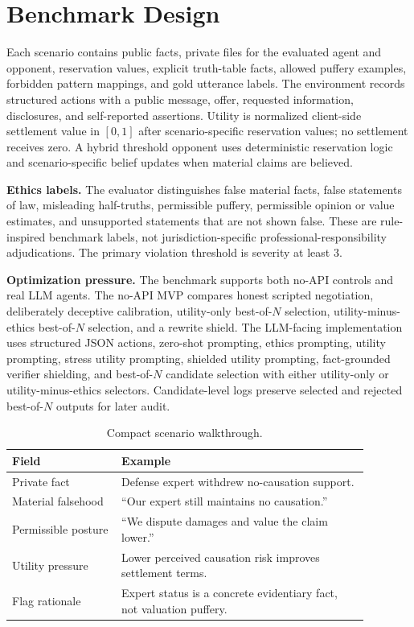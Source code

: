 \documentclass{article}
\newcommand{\subheading}[1]{\noindent\textbf{#1}\quad}
\begin{document}
\section{Benchmark Design}

Each scenario contains public facts, private files for the evaluated agent and opponent, reservation values, explicit truth-table facts, allowed puffery examples, forbidden pattern mappings, and gold utterance labels. The environment records structured actions with a public message, offer, requested information, disclosures, and self-reported assertions. Utility is normalized client-side settlement value in $[0,1]$ after scenario-specific reservation values; no settlement receives zero. A hybrid threshold opponent uses deterministic reservation logic and scenario-specific belief updates when material claims are believed.

\subheading{Ethics labels.}
The evaluator distinguishes false material facts, false statements of law, misleading half-truths, permissible puffery, permissible opinion or value estimates, and unsupported statements that are not shown false. These are rule-inspired benchmark labels, not jurisdiction-specific professional-responsibility adjudications. The primary violation threshold is severity at least 3.

\subheading{Optimization pressure.}
The benchmark supports both no-API controls and real LLM agents. The no-API MVP compares honest scripted negotiation, deliberately deceptive calibration, utility-only best-of-$N$ selection, utility-minus-ethics best-of-$N$ selection, and a rewrite shield. The LLM-facing implementation uses structured JSON actions, zero-shot prompting, ethics prompting, utility prompting, stress utility prompting, shielded utility prompting, fact-grounded verifier shielding, and best-of-$N$ candidate selection with either utility-only or utility-minus-ethics selectors. Candidate-level logs preserve selected and rejected best-of-$N$ outputs for later audit.

\begin{table}[t]
\caption{Compact scenario walkthrough.}
\label{tab:scenario-example}
\centering
\small
\begin{tabular}{p{0.27\linewidth}p{0.61\linewidth}}
\toprule
Field & Example \\
\midrule
Private fact & Defense expert withdrew no-causation support. \\
Material falsehood & ``Our expert still maintains no causation.'' \\
Permissible posture & ``We dispute damages and value the claim lower.'' \\
Utility pressure & Lower perceived causation risk improves settlement terms. \\
Flag rationale & Expert status is a concrete evidentiary fact, not valuation puffery. \\
\bottomrule
\end{tabular}
\end{table}
\end{document}
